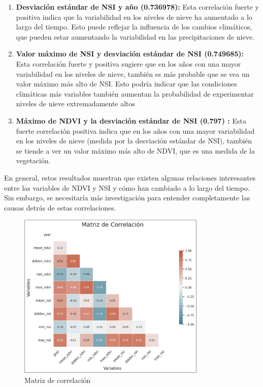 \begin{enumerate}
\item\textbf{Desviación estándar de NSI y año (0.736978): } 
Esta correlación fuerte y positiva indica que la variabilidad en los niveles de nieve ha aumentado a lo largo del tiempo. Esto puede reflejar la influencia de los cambios climáticos, que pueden estar aumentando la variabilidad en las precipitaciones de nieve.\\

\item\textbf{Valor máximo de NSI y desviación estándar de NSI (0.749685):} 
Esta correlación fuerte y positiva sugiere que en los años con una mayor variabilidad en los niveles de nieve, también es más probable que se vea un valor máximo más alto de NSI. Esto podría indicar que las condiciones climáticas más variables también aumentan la probabilidad de experimentar niveles de nieve extremadamente altos\\
\item\textbf{Máximo de NDVI y la desviación estándar de NSI (0.797) :} 
Esta fuerte correlación positiva indica que en los años con una mayor variabilidad en los niveles de nieve (medida por la desviación estándar de NSI), también se tiende a ver un valor máximo más alto de NDVI, que es una medida de la vegetación.\\  

\end{enumerate}

En general, estos resultados muestran que existen algunas relaciones interesantes entre las variables de NDVI y NSI y cómo han cambiado a lo largo del tiempo. Sin embargo, se necesitaría más investigación para entender completamente las causas detrás de estas correlaciones.\\


\begin{figure}[H]
    \centering
    \includegraphics[width=0.8\textwidth]{img_stats/matriz_correlacion.png}
    \caption{Matriz de correlación}
    \label{fig:matriz de correlacion}
\end{figure}


